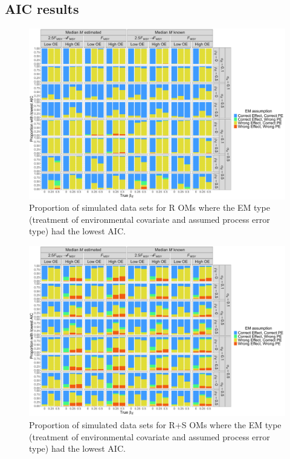 \documentclass[
  12pt,
]{article}
\begin{document}
\hypertarget{aic-results}{%
\subsection*{AIC results}\label{aic-results}}

\begin{landscape}
\begin{figure}
\begin{center}
\includegraphics[height = \textheight]{aic_Rom}
\end{center}
\caption{Proportion of simulated data sets for R OMs where the EM type (treatment of environmental covariate and assumed process error type) had the lowest AIC.}\label{aic_Rom}
\end{figure}
\end{landscape}

\begin{landscape}
\begin{figure}
\begin{center}
\includegraphics[height = \textheight]{aic_RSom}
\end{center}
\caption{Proportion of simulated data sets for R+S OMs where the EM type (treatment of environmental covariate and assumed process error type) had the lowest AIC.}\label{aic_RSom}
\end{figure}
\end{landscape}
\end{document}
